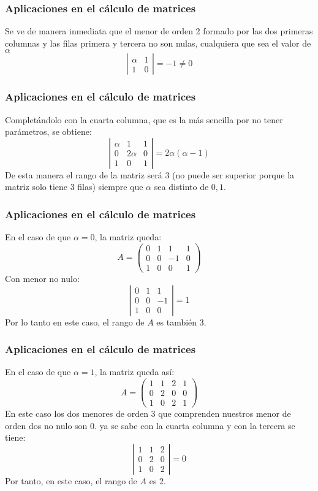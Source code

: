 \documentclass[aspectratio=169]{beamer}
\begin{document}
     \begin{frame}
  \frametitle{Aplicaciones en el c\'alculo de matrices}
Se ve de manera inmediata que el menor de orden 2 formado por las dos primeras columnas y las filas primera y tercera no son nulas, cualquiera que sea el valor de $\alpha$
\[\left|\begin{array}{cc} \alpha & 1 \\ 1&0 \end{array}\right| = -1 \neq 0\]
\end{frame} 


     \begin{frame}
  \frametitle{Aplicaciones en el c\'alculo de matrices}
Complet\'andolo con la cuarta columna, que es la m\'as sencilla por no tener par\'ametros, se obtiene:
\[\left|\begin{array}{ccc} \alpha & 1 &1\\ 0 & 2\alpha &0 \\ 1&0&1 \end{array}\right| = 2\alpha(\alpha-1)\]
De esta manera el rango de la matriz ser\'a 3 (no puede ser superior porque la matriz solo tiene 3 filas) siempre que $\alpha$ sea distinto de $0,1$.
\end{frame} 
  
  
     \begin{frame}
  \frametitle{Aplicaciones en el c\'alculo de matrices}
En el caso de que $\alpha = 0$, la matriz queda:
\[A = \left(\begin{array}{cccc} 0 & 1 & 1 & 1 \\ 0& 0 & -1 & 0 \\ 1&0 & 0 & 1 \end{array}\right)\]
Con menor no nulo:
\[ \left|\begin{array}{ccc} 0 & 1 & 1  \\ 0& 0 & -1  \\ 1&0 & 0  \end{array}\right| = 1\]
Por lo tanto en este caso, el rango de $A$ es tambi\'en 3.
\end{frame} 


     \begin{frame}
  \frametitle{Aplicaciones en el c\'alculo de matrices}
En el caso de que $\alpha = 1$, la matriz queda as\'i:
\[A = \left(\begin{array}{cccc} 1 & 1 & 2 & 1 \\ 0& 2 & 0 & 0 \\ 1&0 & 2 & 1 \end{array}\right)\]
En este caso los dos menores de orden 3 que comprenden nuestros menor de orden dos no nulo son 0. ya se sabe con la cuarta columna y con la tercera se tiene:
\[ \left|\begin{array}{ccc} 1 & 1 & 2  \\ 0& 2 & 0  \\ 1&0 & 2  \end{array}\right| = 0\]
Por tanto, en este caso, el rango de $A$  es 2.
\end{frame} 
\end{document}
